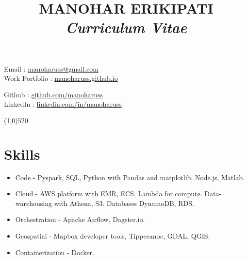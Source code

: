 \documentclass[11pt]{article}
\title{\bfseries MANOHAR ERIKIPATI \\ \large \textit {Curriculum Vitae}}
\date{}
\begin{document}
\maketitle

\vspace{-8.55em}
\begin{minipage}[ht]{0.58\textwidth}
Email : \href{manoharuss@gmail.com}{manoharuss@gmail.com} \\
Work Portfolio : \href{https://manoharuss.github.io/}{manoharuss.github.io}
\end{minipage}
\begin{minipage}[ht]{0.58\textwidth}
\hfill \break
\hfill \break
Github : \href{http://github.com/manoharuss}{github.com/manoharuss} \\
LinkedIn : \href{https://www.linkedin.com/in/manoharuss/}{linkedin.com/in/manoharuss} \\
\end{minipage}
\line(1,0){520}

\section*{Skills}
\begin{itemize}[noitemsep]
\item Code - Pyspark, SQL, Python with Pandas and matplotlib, Node.js, Matlab.
\item Cloud - AWS platform with EMR, ECS, Lambda for compute. Data-warehousing with Athena, S3. Databases DynamoDB, RDS.
\item Orchestration - Apache Airflow, Dagster.io.
\item Geospatial - Mapbox developer tools, Tippecanoe, GDAL, QGIS.
\item Containerization - Docker.
\end{itemize}
\end{document}
